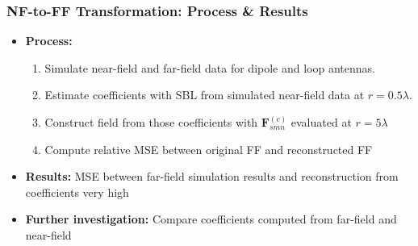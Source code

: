 \documentclass{beamer}
\begin{document}
\begin{frame}
    \frametitle{NF-to-FF Transformation: Process \& Results}
    \begin{itemize}
    		\item \textbf{Process:}
                \begin{enumerate}
                		\item Simulate near-field and far-field data for dipole and loop antennas.
                    \item Estimate coefficients with SBL from simulated near-field data at $r = 0.5\lambda$.
                    \item Construct field from those coefficients with $\mathbf{F}_{smn}^{(c)}$ evaluated at $r=5\lambda$
                    \item Compute relative MSE between original FF and reconstructed FF
                \end{enumerate}
        \item \textbf{Results:} MSE between far-field simulation results and reconstruction from coefficients very high
        \item \textbf{Further investigation:} Compare coefficients computed from far-field and near-field
    \end{itemize}
\end{frame}
\end{document}
